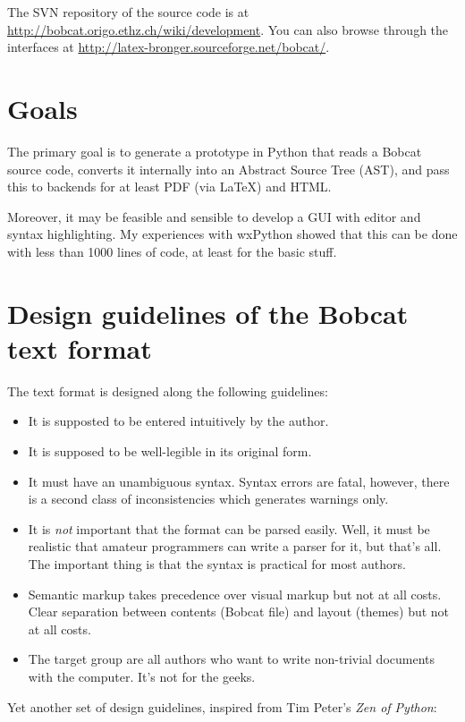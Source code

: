\documentclass[12pt,openany]{book}
\begin{document}
The SVN repository of the source code is at
\url{http://bobcat.origo.ethz.ch/wiki/development}.  You can also browse through
the interfaces at \url{http://latex-bronger.sourceforge.net/bobcat/}.


\section{Goals}

The primary goal is to generate a prototype in Python that reads a Bobcat
source code, converts it internally into an Abstract Source Tree (AST), and
pass this to backends for at least PDF (via \LaTeX) and HTML\@.

Moreover, it may be feasible and sensible to develop a GUI with editor and
syntax highlighting.  My experiences with wxPython showed that this can be done
with less than 1000 lines of code, at least for the basic stuff.


\section{Design guidelines of the Bobcat text format}

The text format is designed along the following guidelines:

\begin{itemize}
\item It is supposted to be entered intuitively by the author.
\item It is supposed to be well-legible in its original form.
\item It must have an unambiguous syntax.  Syntax errors are fatal, however,
  there is a second class of inconsistencies which generates warnings only.
\item It is \emph{not} important that the format can be parsed easily.  Well,
  it must be realistic that amateur programmers can write a parser for it, but
  that's all.  The important thing is that the syntax is practical for most
  authors.
\item Semantic markup takes precedence over visual markup but not at all costs.
  Clear separation between contents (Bobcat file) and layout (themes) but not at
  all costs.
\item The target group are all authors who want to write non-trivial documents
  with the computer.  It's not for the geeks.
\end{itemize}

Yet another set of design guidelines, inspired from Tim Peter's \emph{Zen of Python}:
\end{document}

